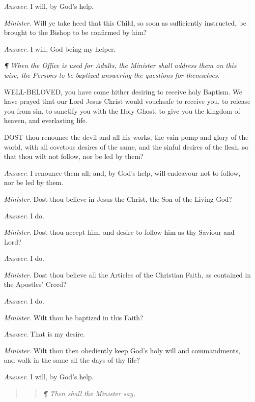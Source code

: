 \emph{Answer}. I will, by God’s help.

\emph{Minister}. Will ye take heed that this Child,
so soon as sufficiently
instructed, be brought to the Bishop to be confirmed by him?

\emph{Answer.} I will, God being my helper.

\emph{¶
When the Office is used for Adults, the Minister shall address them
on this wise, the Persons to be baptized answering the questions for
themselves.}

WELL-BELOVED,
you have come hither desiring to receive holy Baptism. We have prayed
that our Lord Jesus Christ would vouchsafe to receive you, to release
you from sin, to sanctify you with the Holy Ghost, to give you the kingdom
of heaven, and everlasting life.

DOST
thou renounce the devil and all his works, the vain pomp and glory of
the world, with all covetous desires of the same, and the sinful desires
of the flesh, so that thou wilt not follow, nor be led by them? 

\emph{Answer}. I renounce them all; and, by God's
help, will endeavour not to follow, nor be led by them.

\emph{Minister}.
Dost thou believe in Jesus the Christ, the Son of the Living God?

\emph{Answer}. I do.

\emph{Minister}. Dost thou accept him, and desire
to follow him as thy Saviour and Lord?

\emph{Answer}. I do.

\emph{Minister}. Dost thou believe all the Articles
of the Christian Faith, as contained in the Apostles' Creed?

\emph{Answer}. I do.

\emph{Minister}. Wilt thou be baptized in this Faith?

\emph{Answer}. That is my desire.

\emph{Minister}. Wilt thou then obediently keep God's
holy will and commandments, and walk in the same all the days of thy life?

\emph{Answer}. I will, by God's help. 

\begin{quote}

\begin{quote}

\emph{¶
Then shall the Minister say,}

\end{quote}

\end{quote}

